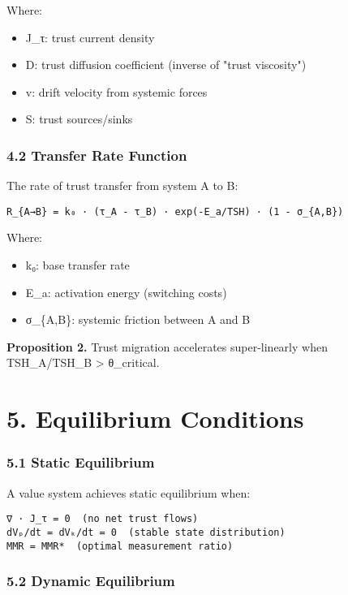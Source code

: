 \documentclass[11pt,oneside]{book}
\begin{document}
{{{{{{Where:
\begin{itemize}
\item J\_τ: trust current density
\item D: trust diffusion coefficient (inverse of "trust viscosity")
\item v: drift velocity from systemic forces
\item S: trust sources/sinks
\end{itemize}

\subsubsection{4.2 Transfer Rate Function}

The rate of trust transfer from system A to B:

\begin{verbatim}
R_{A→B} = k₀ · (τ_A - τ_B) · exp(-E_a/TSH) · (1 - σ_{A,B})
\end{verbatim}

Where:
\begin{itemize}
\item k₀: base transfer rate
\item E\_a: activation energy (switching costs)
\item σ\_\{A,B\}: systemic friction between A and B
\end{itemize}

\textbf{Proposition 2.} Trust migration accelerates super-linearly when TSH_A/TSH_B > θ_critical.

\section{5. Equilibrium Conditions}

\subsubsection{5.1 Static Equilibrium}

A value system achieves static equilibrium when:

\begin{verbatim}
∇ · J_τ = 0  (no net trust flows)
dVₚ/dt = dVₖ/dt = 0  (stable state distribution)
MMR = MMR*  (optimal measurement ratio)
\end{verbatim}

\subsubsection{5.2 Dynamic Equilibrium}

}}}}}}
\end{document}
